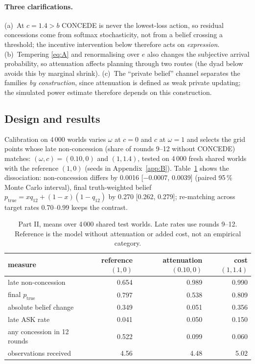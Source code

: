 \documentclass[runningheads]{llncs}
\newcommand{\Etrue}{p_{\mathrm{true}}}
\begin{document}
\paragraph{Three clarifications.} (a)~At $c=1.4>b$ CONCEDE is never the lowest-loss action, so residual concessions come from softmax stochasticity, not from a belief crossing a threshold; the incentive intervention below therefore acts on \emph{expression}. (b)~Tempering \eqref{eq:A} and renormalising over $e$ also changes the subjective arrival probability, so attenuation affects planning through two routes (the dyad below avoids this by marginal shrink). (c)~The ``private belief'' channel separates the families \emph{by construction}, since attenuation is defined as weak private updating; the simulated power estimate therefore depends on this construction.

\subsection{Design and results}
Calibration on 4\,000 worlds varies $\omega$ at $c=0$ and $c$ at $\omega=1$ and selects the grid points whose late non-concession (share of rounds 9--12 without CONCEDE) matches: $(\omega,c)=(0.10,0)$ and $(1,1.4)$, tested on 4\,000 fresh shared worlds with the reference $(1,0)$ (seeds in Appendix~\ref{app:B}). Table~\ref{tab:part2} shows the dissociation: non-concession differs by 0.0016 [$-0.0007$, 0.0039] (paired 95\,\% Monte Carlo interval), final truth-weighted belief $\Etrue=x q_{12}+(1-x)(1-q_{12})$ by 0.270 [0.262, 0.279]; re-matching across target rates 0.70--0.99 keeps the contrast.

\begin{table}[t]
\centering\caption{Part II, means over 4\,000 shared test worlds. Late rates use rounds 9--12. Reference is the model without attenuation or added cost, not an empirical category.}
\label{tab:part2}
\footnotesize
\begin{tabular}{@{}lrrr@{}}
\toprule
measure & reference $(1,0)$ & attenuation $(0.10,0)$ & cost $(1,1.4)$\\
\midrule
late non-concession & 0.654 & 0.989 & 0.990\\
final $\Etrue$ & 0.797 & 0.538 & 0.809\\
absolute belief change & 0.349 & 0.051 & 0.356\\
late ASK rate & 0.041 & 0.050 & 0.150\\
any concession in 12 rounds & 0.522 & 0.099 & 0.060\\
observations received & 4.56 & 4.48 & 5.02\\
\bottomrule
\end{tabular}
\end{table}
\end{document}
